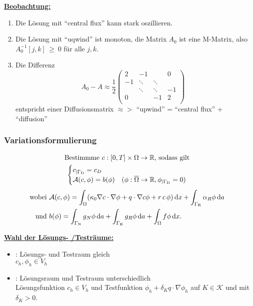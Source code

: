 \underline{\textbf{Beobachtung:}}
\begin{enumerate}
	\item Die Lösung mit \enquote{central flux} kann stark oszillieren.
	\item Die Lösung mit \enquote{uqwind} ist monoton, die Matrix $ A_0 $ ist eine M-Matrix, also $ A_0^{-1}[j,k]~\geq~0 $ für alle $ j,k $.
	\item Die Differenz
	\[ A_0 - A \approx \frac{1}{2}
	\begin{pmatrix} 
	2 & -1 & & 0\\
	-1& \ddots &\ddots & \\
	  & \ddots& \ddots & -1\\	
	0 & & -1 & 2\\		
	\end{pmatrix} \] 
	entspricht einer Diffusionsmatrix $ \approx> $ \enquote{upwind} = \enquote{central flux} + \enquote{diffusion}
\end{enumerate}

\subsubsection{Variationsformulierung}
\begin{gather*}
	\text{Bestimmme } c:[0,T] \times \Omega \to \mathbb{R} \text{, sodass gilt}\\
	\begin{cases}
		c_{|\Gamma_{\text{D}}} = c_D &\\
		\mathcal{A}(c,\phi) = b(\phi) &(\phi: \overline{\Omega} \to \mathbb{R}, \phi_{|\Gamma_{\text{D}}} = 0)
	\end{cases}
\end{gather*}
\begin{align*}
	\text{wobei } &\mathcal{A}(c,\phi) = \int_\Omega (\kappa_0 \nabla c \cdot \nabla \phi + q \cdot \nabla c \phi + r \, c \, \phi) \mathop{}\!\mathrm{d} x + \int_{\Gamma_{\text{R}}} \alpha_R \phi \mathop{}\!\mathrm{d} a\\
	\text{und } &b(\phi) = \int_{\Gamma_{\text{N}}} g_N \phi \mathop{}\!\mathrm{d} a + \int_{\Gamma_{\text{R}}} g_R \phi \mathop{}\!\mathrm{d} a + \int_\Omega f \phi \mathop{}\!\mathrm{d} x.
\end{align*}

\underline{\textbf{Wahl der Lösungs- /Testräume:}}
\begin{itemize}
	\item {}: Lösungs- und Testraum gleich\\ $ c_h, \phi_h \in V_h$
	\item {}: Lösungsraum und Testraum unterschiedlich\\ Lösungsfunktion $ c_h \in V_h $ und Testfunktion $ \phi_h + \delta_K q \cdot \nabla \phi_h $ auf $ K \in \mathcal{K} $ und mit $ \delta_K > 0 $.
\end{itemize}

